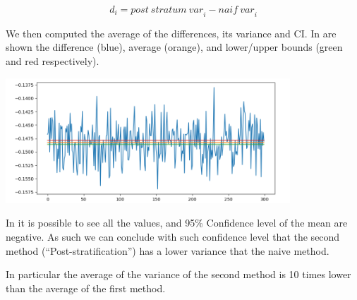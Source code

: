 \documentclass[10pt,a4paper]{article}
\begin{document}
\begin{equation*}
  \mathit{d}_i = \mathit{post\ stratum\ var}_i - \mathit{naif\ var}_i
\end{equation*}

We then computed the average of the differences, its variance and CI. In  are shown the difference (blue), average (orange), and lower/upper bounds (green and red respectively).

\begin{center}
  \includegraphics[width=0.8\textwidth]{post-stratification.png}
  \label{fig:post-stratification}
\end{center}

In  it is possible to see all the values, and 95\% Confidence level of the mean are negative. As such we can conclude with such confidence level that the second method (``Post-stratification'') has a lower variance that the naive method.

In particular the average of the variance of the second method is 10 times lower than the average of the first method.
\end{document}
